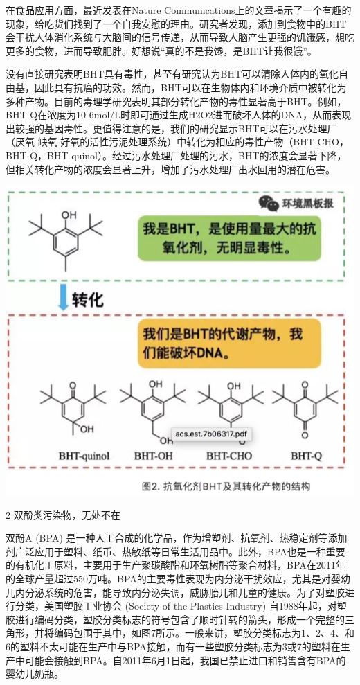 \documentclass[
]{book}
\begin{document}
在食品应用方面，最近发表在Nature Communications上的文章揭示了一个有趣的现象，给吃货们找到了一个自我安慰的理由。研究者发现，添加到食物中的BHT会干扰人体消化系统与大脑间的信号传递，从而导致人脑产生更强的饥饿感，想吃更多的食物，进而导致肥胖。好想说``真的不是我馋，是BHT让我很饿''。

没有直接研究表明BHT具有毒性，甚至有研究认为BHT可以清除人体内的氧化自由基，因此具有抗癌的功效。然而，BHT可以在生物体内和环境介质中被转化为多种产物。目前的毒理学研究表明其部分转化产物的毒性显著高于BHT。例如，BHT-Q在浓度为10-6mol/L时即可通过生成H2O2进而破坏人体的DNA，从而表现出较强的基因毒性。更值得注意的是，我们的研究显示BHT可以在污水处理厂（厌氧-缺氧-好氧的活性污泥处理系统）中转化为相应的毒性产物（BHT-CHO，BHT-Q，BHT-quinol）。经过污水处理厂处理的污水，BHT的浓度会显著下降，但相关转化产物的浓度会显著上升，增加了污水处理厂出水回用的潜在危害。

\includegraphics[width=8.33in]{images/epc2}

2 双酚类污染物，无处不在

双酚A (BPA) 是一种人工合成的化学品，作为增塑剂、抗氧剂、热稳定剂等添加剂广泛应用于塑料、纸币、热敏纸等日常生活用品中。此外，BPA也是一种重要的有机化工原料，主要用于生产聚碳酸酯和环氧树酯等聚合材料，BPA在2011年的全球产量超过550万吨。BPA的主要毒性表现为内分泌干扰效应，尤其是对婴幼儿内分泌系统的危害，能导致内分泌失调，威胁胎儿和儿童的健康。为了对塑胶进行分类，美国塑胶工业协会 (Society of the Plastics Industry) 自1988年起，对塑胶进行编码分类，塑胶分类标志的符号包含了顺时针转的箭头，形成一个完整的三角形，并将编码包围于其中，如图7所示。一般来讲，塑胶分类标志为1、2、4、和6的塑料不太可能在生产中与BPA接触，而有一些塑胶分类标志为3或7的塑料在生产中可能会接触到BPA。自2011年6月1日起，我国已禁止进口和销售含有BPA的婴幼儿奶瓶。
\end{document}
